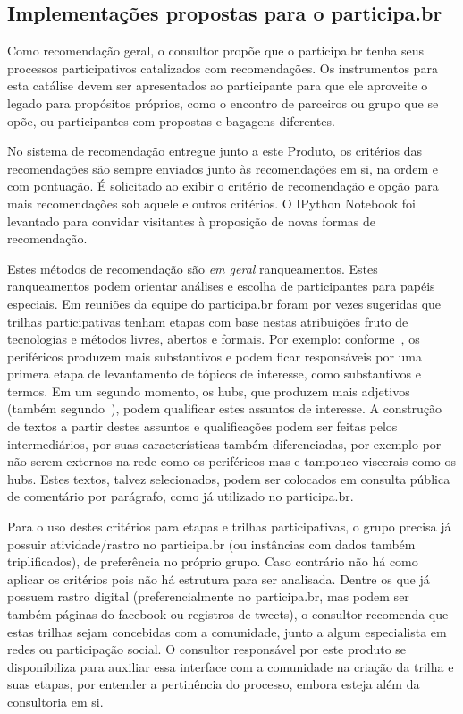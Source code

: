 \documentclass[12pt]{article}
\begin{document}
\subsection{Implementações propostas para o participa.br}\label{sec:props}

Como recomendação geral, o consultor propõe que o participa.br tenha seus processos participativos catalizados com recomendações. Os instrumentos para
esta catálise devem ser apresentados ao participante para que ele aproveite o legado para propósitos próprios, como o encontro de parceiros ou grupo que se opõe, ou participantes com propostas e bagagens diferentes.

No sistema de recomendação entregue junto a este Produto, os critérios das recomendações são sempre enviados junto às recomendações em si, na ordem e com pontuação. É solicitado ao exibir o critério de recomendação e opção para mais recomendações sob aquele e outros critérios. O IPython Notebook foi levantado para convidar visitantes à proposição de novas formas de recomendação.

Estes métodos de recomendação são \emph{em geral} ranqueamentos. Estes ranqueamentos podem orientar análises e escolha de participantes para papéis especiais. Em reuniões da equipe do participa.br foram por vezes sugeridas que trilhas participativas tenham etapas com base nestas atribuições fruto de tecnologias e métodos livres, abertos e formais. Por exemplo: conforme~\cite{fabbri2}, os periféricos produzem mais substantivos e podem ficar responsáveis por uma primera etapa de levantamento de tópicos de interesse, como substantivos e termos. Em um segundo momento, os hubs, que produzem mais adjetivos (também segundo~\cite{fabbri2}), podem qualificar estes assuntos de interesse. A construção de textos a partir destes assuntos e qualificações podem ser feitas pelos intermediários, por suas características também diferenciadas, por exemplo por não serem externos na rede como os periféricos mas e tampouco viscerais como os hubs. Estes textos, talvez selecionados, podem ser colocados em consulta pública de comentário por parágrafo, como já utilizado no participa.br.

Para o uso destes critérios para etapas e trilhas participativas, o grupo precisa já possuir atividade/rastro no participa.br (ou instâncias com dados também triplificados), de preferência no próprio grupo. Caso contrário não há como aplicar os critérios pois não há estrutura para ser analisada. Dentre os que já possuem rastro digital (preferencialmente no participa.br, mas podem ser também páginas do facebook ou registros de tweets), o consultor recomenda que estas trilhas sejam concebidas com a comunidade, junto a algum especialista em redes ou participação social. O consultor responsável por este produto se disponibiliza para auxiliar essa interface com a comunidade na criação da trilha e suas etapas, por entender a pertinência do processo, embora esteja além da consultoria em si.
\end{document}
